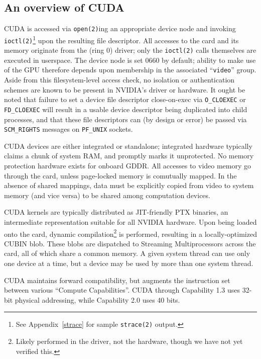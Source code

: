 \documentclass[letterpaper,10pt]{article}
\begin{document}
\begin{multicols}{2}
\section{An overview of CUDA}
CUDA is accessed via \texttt{open(2)}ing an appropriate device node and
invoking \texttt{ioctl(2)}\footnote{See Appendix~\ref{strace} for sample \texttt{strace(2)}
output.} upon the resulting file descriptor. All accesses to the card and its memory
originate from the (ring 0) driver; only the \texttt{ioctl(2)} calls themselves
are executed in userspace. The device node is set 0660 by default;
ability to make use of the GPU therefore depends upon membership in the
associated ``\texttt{video}'' group. Aside from this filesystem-level access check, no
isolation or authentication schemes are known to be present in NVIDIA's driver
or hardware. It ought be noted that failure to set a device file descriptor
close-on-exec via \texttt{O\_CLOEXEC} or \texttt{FD\_CLOEXEC} will
result in a usable device descriptor being duplicated into child processes,
and that these file descriptors can (by design or error) be passed via
\texttt{SCM\_RIGHTS} messages on \texttt{PF\_UNIX} sockets.

CUDA devices are either integrated or standalone; integrated hardware typically
claims a chunk of system RAM, and promptly marks it unprotected. No memory
protection hardware exists for onboard GDDR\@. All accesses to video memory go
through the card, unless page-locked memory is comutually mapped. In the
absence of shared mappings, data must be explicitly copied from video to system
memory (and vice versa) to be shared among computation devices\cite{cudaguide}.

CUDA kernels are typically distributed as JIT-friendly PTX binaries\cite{kerr},
an intermediate representation suitable for all NVIDIA hardware. Upon being
loaded onto the card, dynamic compilation\footnote{Likely performed in the
driver, not the hardware, though we have not yet verified this.} is performed,
resulting in a locally-optimized CUBIN blob. These blobs are dispatched to
Streaming Multiprocessors across the card, all of which share a common memory.
A given system thread can use only one device at a time, but a device may be
used by more than one system thread.

CUDA maintains forward compatibility, but augments the instruction set
between various ``Compute Capabilities''.  CUDA through Capability 1.3 uses
32-bit physical addressing, while Capability 2.0 uses 40 bits.


\end{multicols}
\end{document}
